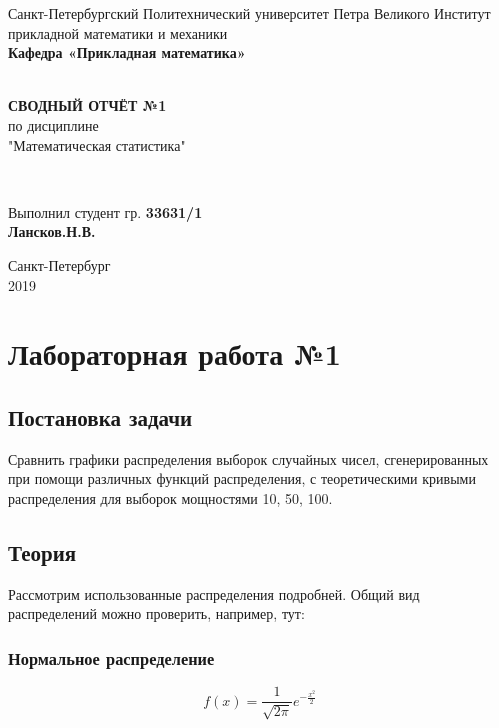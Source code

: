 \documentclass[12pt]{report}
\renewcommand{\listoffigures}{\begingroup  %
\tocsection
\tocfile{\listfigurename}{lof}
\endgroup}
\renewcommand{\listoftables}{\begingroup  %
\tocsection
\tocfile{\listtablename}{lot}
\endgroup}
\begin{document}
\begin{titlepage}
	\center
		Санкт-Петербургский Политехнический 
		университет Петра Великого
		Институт прикладной математики и механики
		\\ \textbf{Кафедра «Прикладная математика»}

	\vfill ~
	\textbf{
		\\ \large СВОДНЫЙ ОТЧЁТ №1
	}
	\\	по дисциплине 
	\\	"Математическая статистика"

	\vfill ~

	Выполнил студент гр. \textbf{33631/1} \\
	\textbf{Лансков.Н.В.} \\ 

\vfill

{\large}	Санкт-Петербург
\\ 2019
\end{titlepage}


\tableofcontents 
\newpage
\listoffigures
\newpage
\listoftables
\newpage

\chapter{Лабораторная работа №1}
\section{Постановка задачи}
Сравнить графики распределения выборок случайных чисел, сгенерированных при помощи различных функций распределения, с теоретическими кривыми распределения для выборок мощностями 10, 50, 100.

\section{Теория}
Рассмотрим использованные распределения подробней. Общий вид распределений можно проверить, например, тут: \cite{wiki}

\subsection{Нормальное распределение}

\begin{equation}
f(x)= \frac{1}{\sqrt{2\pi}}e^{-\frac{x^2}{2}}
\end{equation}
\end{document}
